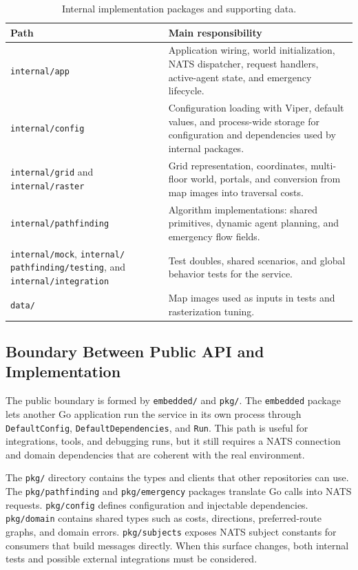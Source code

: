 \documentclass[12pt,a4paper]{report}
\begin{document}
\begin{table}[H]
\centering
\begin{tabular}{|p{}|p{}|}
\hline
\textbf{Path} & \textbf{Main responsibility} \\
\hline
\texttt{internal/app} &
Application wiring, world initialization, NATS dispatcher, request handlers,
active-agent state, and emergency lifecycle. \\
\hline
\texttt{internal/config} &
Configuration loading with Viper, default values, and process-wide storage for
configuration and dependencies used by internal packages. \\
\hline
\texttt{internal/grid} and \texttt{internal/raster} &
Grid representation, coordinates, multi-floor world, portals, and conversion
from map images into traversal costs. \\
\hline
\texttt{internal/pathfinding} &
Algorithm implementations: shared primitives, dynamic agent planning, and
emergency flow fields. \\
\hline
\texttt{internal/mock}, \texttt{internal/} \newline \texttt{pathfinding/testing}, and
\texttt{internal/integration} &
Test doubles, shared scenarios, and global behavior tests for the service. \\
\hline
\texttt{data/} &
Map images used as inputs in tests and rasterization tuning. \\
\hline
\end{tabular}
\caption{Internal implementation packages and supporting data.}
\end{table}

\subsection{Boundary Between Public API and Implementation}

The public boundary is formed by \texttt{embedded/} and \texttt{pkg/}. The
\texttt{embedded} package lets another Go application run the service in its own
process through \texttt{DefaultConfig}, \newline \texttt{DefaultDependencies}, and
\texttt{Run}. This path is useful for integrations, tools, and debugging runs,
but it still requires a NATS connection and domain dependencies that are
coherent with the real environment.

The \texttt{pkg/} directory contains the types and clients that other
repositories can use. The \texttt{pkg/pathfinding} and \texttt{pkg/emergency}
packages translate Go calls into NATS requests. \texttt{pkg/config} defines
configuration and injectable dependencies. \texttt{pkg/domain} contains shared
types such as costs, directions, preferred-route graphs, and domain errors.
\newline \texttt{pkg/subjects} exposes NATS subject constants for consumers that build
messages directly. When this surface changes, both internal tests and possible
external integrations must be considered.
\end{document}
